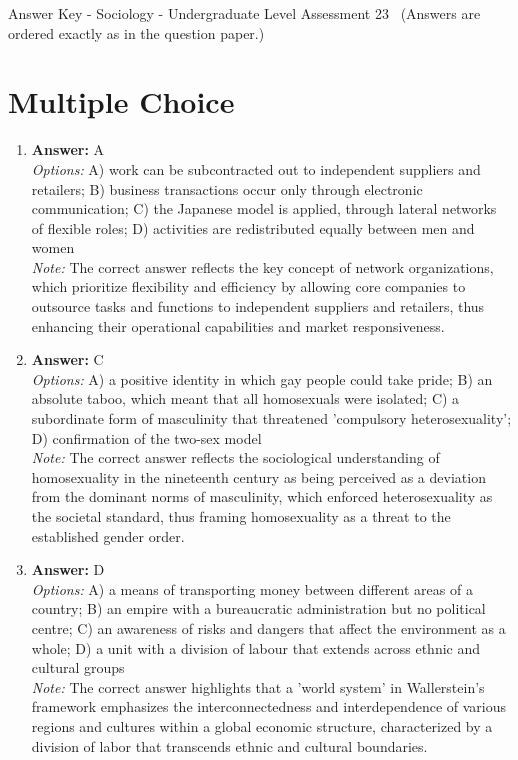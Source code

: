 \documentclass[12pt]{article}
\begin{document}
\begin{center}
Answer Key - Sociology - Undergraduate Level Assessment 23 \
\small (Answers are ordered exactly as in the question paper.)
\end{center}

\section*{Multiple Choice}
\begin{enumerate}[label=\arabic*.]
\item \textbf{Answer:} A
\\ \textit{Options:} A) work can be subcontracted out to independent suppliers and retailers; B) business transactions occur only through electronic communication; C) the Japanese model is applied, through lateral networks of flexible roles; D) activities are redistributed equally between men and women
\\ \textit{Note:} The correct answer reflects the key concept of network organizations, which prioritize flexibility and efficiency by allowing core companies to outsource tasks and functions to independent suppliers and retailers, thus enhancing their operational capabilities and market responsiveness.
\item \textbf{Answer:} C
\\ \textit{Options:} A) a positive identity in which gay people could take pride; B) an absolute taboo, which meant that all homosexuals were isolated; C) a subordinate form of masculinity that threatened 'compulsory heterosexuality'; D) confirmation of the two-sex model
\\ \textit{Note:} The correct answer reflects the sociological understanding of homosexuality in the nineteenth century as being perceived as a deviation from the dominant norms of masculinity, which enforced heterosexuality as the societal standard, thus framing homosexuality as a threat to the established gender order.
\item \textbf{Answer:} D
\\ \textit{Options:} A) a means of transporting money between different areas of a country; B) an empire with a bureaucratic administration but no political centre; C) an awareness of risks and dangers that affect the environment as a whole; D) a unit with a division of labour that extends across ethnic and cultural groups
\\ \textit{Note:} The correct answer highlights that a 'world system' in Wallerstein's framework emphasizes the interconnectedness and interdependence of various regions and cultures within a global economic structure, characterized by a division of labor that transcends ethnic and cultural boundaries.

\end{enumerate}
\end{document}
